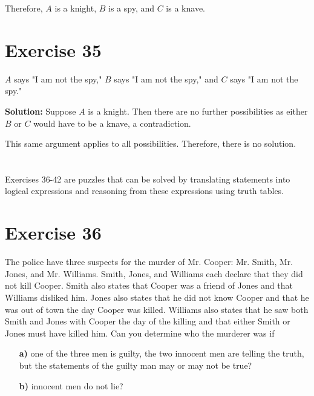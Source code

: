 \documentclass{Axon}
\begin{document}
Therefore, \(A\) is a knight, \(B\) is a spy, and \(C\) is a knave.

\section*{Exercise 35}
\(A\) says "I am not the spy," \(B\) says "I am not the spy," and \(C\) says "I am not the spy."

\noindent
\textbf{Solution:}
Suppose \(A\) is a knight. Then there are no further possibilities as either \(B\) or \(C\) would have to be a knave, a contradiction.

This same argument applies to all possibilities. Therefore, there is no solution.

\section*{}
Exercises 36-42 are puzzles that can be solved by translating statements into logical expressions and reasoning from these expressions using truth tables.

\section*{Exercise 36}
The police have three suspects for the murder of Mr. Cooper: Mr. Smith, Mr. Jones, and Mr. Williams. Smith, Jones, and Williams each declare that they did not kill Cooper. Smith also states that Cooper was a friend of Jones and that Williams disliked him. Jones also states that he did not know Cooper and that he was out of town the day Cooper was killed. Williams also states that he saw both Smith and Jones with Cooper the day of the killing and that either Smith or Jones must have killed him. Can you determine who the murderer was if
\begin{enumerate}
    \item[\textbf{a)}] one of the three men is guilty, the two innocent men are telling the truth, but the statements of the guilty man may or may not be true?
    \item[\textbf{b)}] innocent men do not lie?
\end{enumerate}
\end{document}
